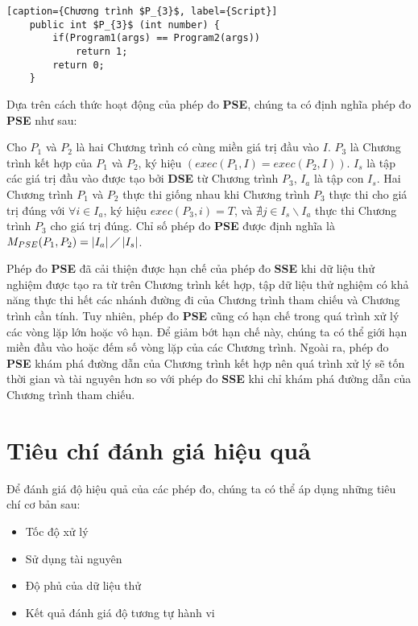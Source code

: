 \begin{lstlisting}[caption={Chương trình $P_{3}$, label={Script}]
	public int $P_{3}$ (int number) {
		if(Program1(args) == Program2(args))
			return 1;
		return 0;
	}
\end{lstlisting}

Dựa trên cách thức hoạt động của phép đo \textbf{PSE}, chúng ta có định nghĩa phép đo \textbf{PSE} như sau:

\begin{definition}
Cho $P_{1}$ và $P_{2}$ là hai Chương trình có cùng miền giá trị đầu vào $I$. $P_{3}$ là Chương trình
kết hợp của $P_{1}$ và $P_{2}$, ký hiệu $(exec(P_{1}, I) =  exec(P_{2}, I))$.  $I_{s}$ là tập các giá trị đầu vào được tạo bởi \textbf{DSE} từ Chương trình $P_{3}$, $I_{a}$ là tập con $I_{s}$. Hai Chương trình $P_{1}$ và $P_{2}$ thực thi giống nhau khi Chương trình $P_{3}$ thực thi cho giá trị đúng với $\forall i \in I_{a}$, ký hiệu $exec(P_{3}, i) = T$, và $\nexists j \in I_{s} \backslash I_{a}$ thực thi Chương trình $P_{3}$ cho giá trị đúng. Chỉ số phép đo \textbf{PSE} được định nghĩa là $M_{PSE}(P_{1}, P_{2}) = \left|I_{a}\right| \diagup \left|I_{s}\right| $.
\end{definition}

Phép đo \textbf{PSE} đã cải thiện được hạn chế của phép đo \textbf{SSE} khi dữ liệu thử nghiệm được  tạo ra từ trên Chương trình kết hợp, tập dữ liệu thử nghiệm có khả năng thực thi hết các nhánh đường đi của Chương trình tham chiếu và Chương trình cần tính. Tuy nhiên, phép đo \textbf{PSE} cũng có hạn chế trong quá trình xử lý các vòng lặp lớn hoặc vô hạn. Để giảm bớt hạn chế này, chúng ta có thể giới hạn miền đầu vào hoặc đếm số vòng lặp của các Chương trình. Ngoài ra, phép đo \textbf{PSE} khám phá đường dẫn của Chương trình kết hợp nên quá trình xử lý sẽ tốn thời gian và tài nguyên hơn so với phép đo \textbf{SSE} khi chỉ khám phá đường dẫn của Chương trình tham chiếu.

\section{Tiêu chí đánh giá hiệu quả}
Để đánh giá độ hiệu quả của các phép đo, chúng ta có thể áp dụng những tiêu chí cơ bản sau:
\begin{itemize}
\item Tốc độ xử lý
\item Sử dụng tài nguyên
\item Độ phủ của dữ liệu thử
\item Kết quả đánh giá độ tương tự hành vi
\end{itemize}

